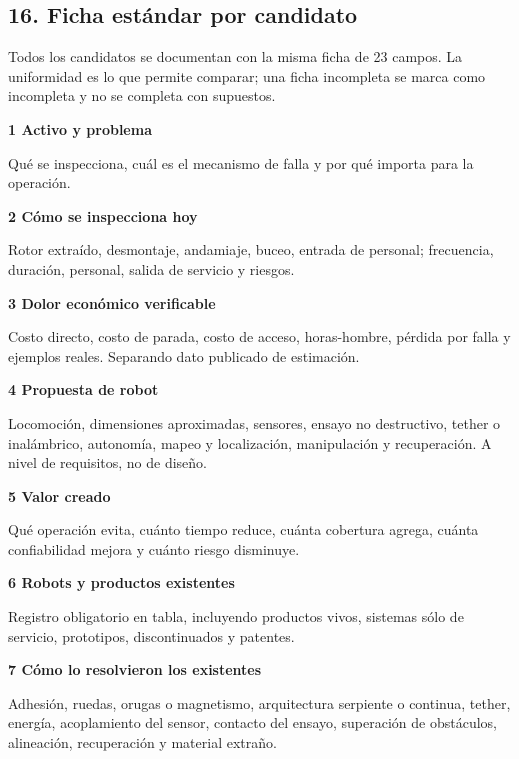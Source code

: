 \documentclass[11pt,a4paper]{article}
\newenvironment{tarjeta}[2]
  {\begin{tarjetabase}%
   {\sffamily\bfseries\color{navy}#1}%
   \ifstrempty{#2}{}{\\[1pt]{\sffamily\scriptsize\color{gray2}#2}}%
   \par\vspace{3pt}}
  {\end{tarjetabase}}
\begin{document}
\subsection*{16. Ficha estándar por candidato}

Todos los candidatos se documentan con la misma ficha de 23 campos. La uniformidad es lo que permite comparar; una ficha incompleta se marca como incompleta y no se completa con supuestos.

\begin{tarjeta}{1 \textperiodcentered{} Activo y problema}{}
Qué se inspecciona, cuál es el mecanismo de falla y por qué importa para la operación.

\end{tarjeta}
\begin{tarjeta}{2 \textperiodcentered{} Cómo se inspecciona hoy}{}
Rotor extraído, desmontaje, andamiaje, buceo, entrada de personal; frecuencia, duración, personal, salida de servicio y riesgos.

\end{tarjeta}
\begin{tarjeta}{3 \textperiodcentered{} Dolor económico verificable}{}
Costo directo, costo de parada, costo de acceso, horas-hombre, pérdida por falla y ejemplos reales. Separando dato publicado de estimación.

\end{tarjeta}
\begin{tarjeta}{4 \textperiodcentered{} Propuesta de robot}{}
Locomoción, dimensiones aproximadas, sensores, ensayo no destructivo, tether o inalámbrico, autonomía, mapeo y localización, manipulación y recuperación. A nivel de requisitos, no de diseño.

\end{tarjeta}
\begin{tarjeta}{5 \textperiodcentered{} Valor creado}{}
Qué operación evita, cuánto tiempo reduce, cuánta cobertura agrega, cuánta confiabilidad mejora y cuánto riesgo disminuye.

\end{tarjeta}
\begin{tarjeta}{6 \textperiodcentered{} Robots y productos existentes}{}
Registro obligatorio en tabla, incluyendo productos vivos, sistemas sólo de servicio, prototipos, discontinuados y patentes.

\end{tarjeta}
\begin{tarjeta}{7 \textperiodcentered{} Cómo lo resolvieron los existentes}{}
Adhesión, ruedas, orugas o magnetismo, arquitectura serpiente o continua, tether, energía, acoplamiento del sensor, contacto del ensayo, superación de obstáculos, alineación, recuperación y material extraño.

\end{tarjeta}
\end{document}

